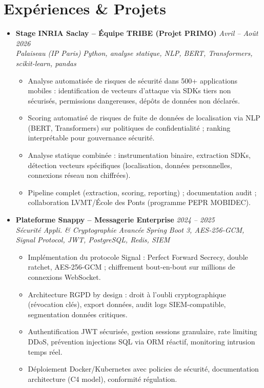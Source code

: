 \documentclass[a4paper,11pt]{article}
\begin{document}
\section{Exp\'eriences \& Projets}
\begin{itemize}[leftmargin=*, label={-}]
    \item \textbf{Stage INRIA Saclay -- \'Equipe TRIBE (Projet PRIMO)} \hfill \textit{Avril -- Ao\^ut 2026} \\
    \textit{Palaiseau (IP Paris)} \hfill \textit{Python, analyse statique, NLP, BERT, Transformers, scikit-learn, pandas}
    \vspace{-2pt}
    \begin{itemize}[leftmargin=0.4cm, nosep, label=\tiny$\bullet$]
        \item \small{Analyse automatisée de risques de sécurité dans 500+ applications mobiles : identification de vecteurs d'attaque via SDKs tiers non sécurisés, permissions dangereuses, dépôts de données non déclarés.}
        \item \small{Scoring automatisé de risques de fuite de données de localisation via NLP (BERT, Transformers) sur politiques de confidentialité ; ranking interprétable pour gouvernance sécurité.}
        \item \small{Analyse statique combinée : instrumentation binaire, extraction SDKs, détection vecteurs spécifiques (localisation, données personnelles, connexions réseau non chiffrées).}
        \item \small{Pipeline complet (extraction, scoring, reporting) ; documentation audit ; collaboration LVMT/École des Ponts (programme PEPR MOBIDEC).}
    \end{itemize}
    \vspace{3pt}

    \item \textbf{Plateforme Snappy -- Messagerie Enterprise} \hfill \textit{2024 -- 2025} \\
    \textit{Sécurité Appli. \& Cryptographie Avancée} \hfill \textit{Spring Boot 3, AES-256-GCM, Signal Protocol, JWT, PostgreSQL, Redis, SIEM}
    \vspace{-2pt}
    \begin{itemize}[leftmargin=0.4cm, nosep, label=\tiny$\bullet$]
        \item \small{Implémentation du protocole Signal : Perfect Forward Secrecy, double ratchet, AES-256-GCM ; chiffrement bout-en-bout sur millions de connexions WebSocket.}
        \item \small{Architecture RGPD by design : droit à l'oubli cryptographique (révocation clés), export données, audit logs SIEM-compatible, segmentation données critiques.}
        \item \small{Authentification JWT sécurisée, gestion sessions granulaire, rate limiting DDoS, prévention injections SQL via ORM réactif, monitoring intrusion temps réel.}
        \item \small{Déploiement Docker/Kubernetes avec policies de sécurité, documentation architecture (C4 model), conformité régulation.}
    \end{itemize}
    \vspace{3pt}


\end{itemize}
\end{document}
